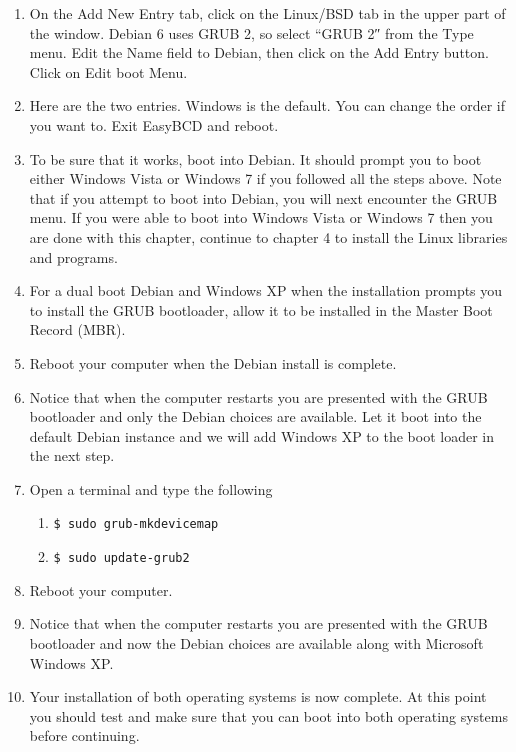 \documentclass[12pt,notitlepage,onecolumn,oneside,openany]{memoir}
\begin{document}
\begin{enumerate}
\item \textsf{On the Add New Entry tab, click on the Linux/BSD tab in the upper part of the window. Debian 6 uses GRUB 2, so select “GRUB 2″ from the Type menu. Edit the Name field to Debian, then click on the Add Entry button. Click on Edit boot Menu.}
 
\item \textsf{Here are the two entries. Windows is the default. You can change the order if you want to. Exit EasyBCD and reboot.} 

\item \textsf{To be sure that it works, boot into Debian. It should prompt you to boot either Windows Vista or Windows 7 if you followed all the steps above. Note that if you attempt to boot into Debian, you will next encounter the GRUB menu.  If you were able to boot into Windows Vista or Windows 7 then you are done with this chapter, continue to chapter 4 to install the Linux libraries and programs.}

\item \textsf{For a dual boot Debian and Windows XP when the installation prompts you to install the GRUB bootloader, allow it to be installed in the Master Boot Record (MBR).}

\item \textsf{Reboot your computer when the Debian install is complete.}

\item \textsf{Notice that when the computer restarts you are presented with the GRUB bootloader and only the Debian choices are available.  Let it boot into the default Debian instance and we will add Windows XP to the boot loader in the next step.}

\item \textsf{Open a terminal and type the following}
      \begin{enumerate}
      \item \texttt{\$ sudo grub-mkdevicemap}
      \item \texttt{\$ sudo update-grub2}
      \end{enumerate}
      
\item \textsf{Reboot your computer.}

\item \textsf{Notice that when the computer restarts you are presented with the GRUB bootloader and now the Debian choices are available along with Microsoft Windows XP.}

\item \textsf{Your installation of both operating systems is now complete.  At this point you should test and make sure that you can boot into both operating systems before continuing.}
\end{enumerate}
\end{document}

